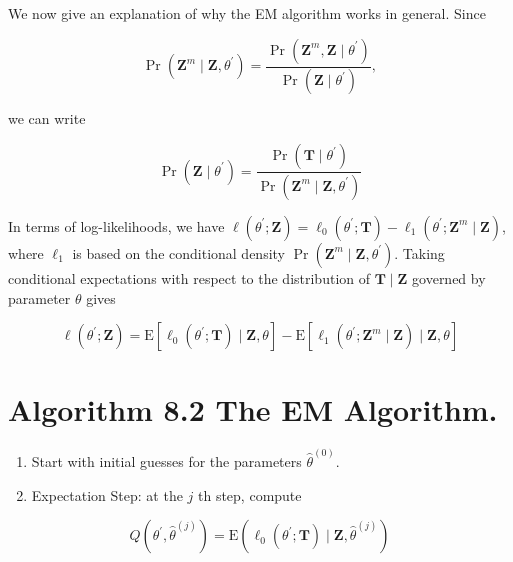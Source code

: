 \documentclass[10pt]{article}
\begin{document}
We now give an explanation of why the EM algorithm works in general. Since


\begin{equation*}
\operatorname{Pr}\left(\mathbf{Z}^{m} \mid \mathbf{Z}, \theta^{\prime}\right)=\frac{\operatorname{Pr}\left(\mathbf{Z}^{m}, \mathbf{Z} \mid \theta^{\prime}\right)}{\operatorname{Pr}\left(\mathbf{Z} \mid \theta^{\prime}\right)}, \tag{8.44}
\end{equation*}


we can write


\begin{equation*}
\operatorname{Pr}\left(\mathbf{Z} \mid \theta^{\prime}\right)=\frac{\operatorname{Pr}\left(\mathbf{T} \mid \theta^{\prime}\right)}{\operatorname{Pr}\left(\mathbf{Z}^{m} \mid \mathbf{Z}, \theta^{\prime}\right)} \tag{8.45}
\end{equation*}


In terms of log-likelihoods, we have $\ell\left(\theta^{\prime} ; \mathbf{Z}\right)=\ell_{0}\left(\theta^{\prime} ; \mathbf{T}\right)-\ell_{1}\left(\theta^{\prime} ; \mathbf{Z}^{m} \mid \mathbf{Z}\right)$, where $\ell_{1}$ is based on the conditional density $\operatorname{Pr}\left(\mathbf{Z}^{m} \mid \mathbf{Z}, \theta^{\prime}\right)$. Taking conditional expectations with respect to the distribution of $\mathbf{T} \mid \mathbf{Z}$ governed by parameter $\theta$ gives

$$
\ell\left(\theta^{\prime} ; \mathbf{Z}\right)=\mathrm{E}\left[\ell_{0}\left(\theta^{\prime} ; \mathbf{T}\right) \mid \mathbf{Z}, \theta\right]-\mathrm{E}\left[\ell_{1}\left(\theta^{\prime} ; \mathbf{Z}^{m} \mid \mathbf{Z}\right) \mid \mathbf{Z}, \theta\right]
$$

\section*{Algorithm 8.2 The EM Algorithm.}
\begin{enumerate}
  \item Start with initial guesses for the parameters $\hat{\theta}^{(0)}$.
  \item Expectation Step: at the $j$ th step, compute
\end{enumerate}


\begin{equation*}
Q\left(\theta^{\prime}, \hat{\theta}^{(j)}\right)=\mathrm{E}\left(\ell_{0}\left(\theta^{\prime} ; \mathbf{T}\right) \mid \mathbf{Z}, \hat{\theta}^{(j)}\right) \tag{8.43}
\end{equation*}
\end{document}
